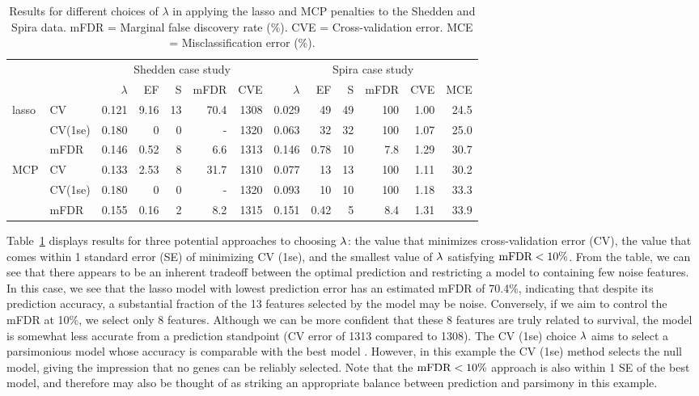 \begin{table}[htb!]
\centering
\caption{\label{Tab:case-studies} Results for different choices of $\lambda$ in applying the lasso and MCP penalties to the Shedden and Spira data.  mFDR = Marginal false discovery rate (\%). CVE = Cross-validation error.  MCE = Misclassification error (\%).}
\vspace{.2cm}
\begin{tabular}{l l r r r r r @{\hskip 0.5in} r r r r r r}
  \hline
  & & \multicolumn{5}{c}{Shedden case study} & \multicolumn{6}{c}{Spira case study}\\
  & & $\lambda$ & EF & S & mFDR & CVE & $\lambda$ & EF & S & mFDR & CVE & MCE\\
  \hline
  lasso & CV & 0.121 & 9.16 & 13 & 70.4 & 1308 & 0.029 & 49 & 49 & 100 & 1.00 & 24.5  \\
  & CV(1se) & 0.180  &  0 &  0 &  -  & 1320 & 0.063 & 32 & 32 & 100 & 1.07 & 25.0  \\
  & mFDR & 0.146 & 0.52 & 8 & 6.6 & 1313 & 0.146 & 0.78 & 10 & 7.8 & 1.29 & 30.7 \\
  MCP & CV & 0.133 & 2.53 & 8 & 31.7 & 1310 & 0.077 & 13 & 13 & 100 & 1.11 & 30.2 \\
  & CV(1se) & 0.180 & 0 & 0 & - & 1320 & 0.093 & 10 & 10 & 100 & 1.18 & 33.3  \\
  & mFDR & 0.155 & 0.16 & 2 & 8.2 & 1315 & 0.151 & 0.42 & 5 & 8.4 & 1.31 & 33.9 \\
  \hline
\end{tabular}
\end{table}

Table~\ref{Tab:case-studies} displays results for three potential approaches to choosing $\lambda$: the value that minimizes cross-validation error (CV), the value that comes within 1 standard error (SE) of minimizing CV (1se), and the smallest value of $\lambda$ satisfying $\textrm{mFDR} < 10\%$.
From the table, we can see that there appears to be an inherent tradeoff between the optimal prediction and restricting a model to containing few noise features.
In this case, we see that the lasso model with lowest prediction error has an estimated mFDR of 70.4\%, indicating that despite its prediction accuracy, a substantial fraction of the 13 features selected by the model may be noise. Conversely, if we aim to control the mFDR at 10\%, we select only 8 features.  Although we can be more confident that these 8 features are truly related to survival, the model is somewhat less accurate from a prediction standpoint (CV error of 1313 compared to 1308).  The CV (1se) choice $\lambda$ aims to select a parsimonious model whose accuracy is comparable with the best model \citep{Hastie2009}. However, in this example the CV (1se) method selects the null model, giving the impression that no genes can be reliably selected.  Note that the $\textrm{mFDR} < 10\%$ approach is also within 1 SE of the best model, and therefore may also be thought of as striking an appropriate balance between prediction and parsimony in this example.

